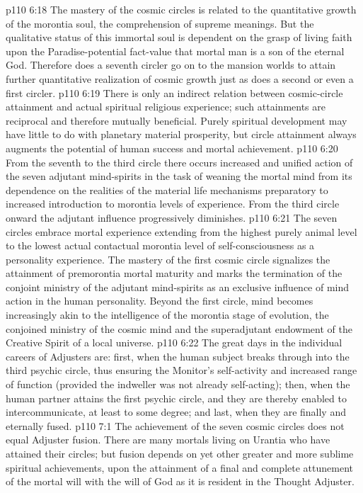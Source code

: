 \vs p110 6:18 The mastery of the cosmic circles is related to the quantitative growth of the morontia soul, the comprehension of supreme meanings. But the qualitative status of this immortal soul is  dependent on the grasp of living faith upon the Paradise\hyp{}potential fact\hyp{}value that mortal man is a son of the eternal God. Therefore does a seventh circler go on to the mansion worlds to attain further quantitative realization of cosmic growth just as does a second or even a first circler.
\vs p110 6:19 There is only an indirect relation between cosmic\hyp{}circle attainment and actual spiritual religious experience; such attainments are reciprocal and therefore mutually beneficial. Purely spiritual development may have little to do with planetary material prosperity, but circle attainment always augments the potential of human success and mortal achievement.
\vs p110 6:20 From the seventh to the third circle there occurs increased and unified action of the seven adjutant mind\hyp{}spirits in the task of weaning the mortal mind from its dependence on the realities of the material life mechanisms preparatory to increased introduction to morontia levels of experience. From the third circle onward the adjutant influence progressively diminishes.
\vs p110 6:21 \pc The seven circles embrace mortal experience extending from the highest purely animal level to the lowest actual contactual morontia level of self\hyp{}consciousness as a personality experience. The mastery of the first cosmic circle signalizes the attainment of premorontia mortal maturity and marks the termination of the conjoint ministry of the adjutant mind\hyp{}spirits as an exclusive influence of mind action in the human personality. Beyond the first circle, mind becomes increasingly akin to the intelligence of the morontia stage of evolution, the conjoined ministry of the cosmic mind and the superadjutant endowment of the Creative Spirit of a local universe.
\vs p110 6:22 The great days in the individual careers of Adjusters are: first, when the human subject breaks through into the third psychic circle, thus ensuring the Monitor’s self\hyp{}activity and increased range of function (provided the indweller was not already self\hyp{}acting); then, when the human partner attains the first psychic circle, and they are thereby enabled to intercommunicate, at least to some degree; and last, when they are finally and eternally fused.
\vs p110 7:1 The achievement of the seven cosmic circles does not equal Adjuster fusion. There are many mortals living on Urantia who have attained their circles; but fusion depends on yet other greater and more sublime spiritual achievements, upon the attainment of a final and complete attunement of the mortal will with the will of God as it is resident in the Thought Adjuster.
